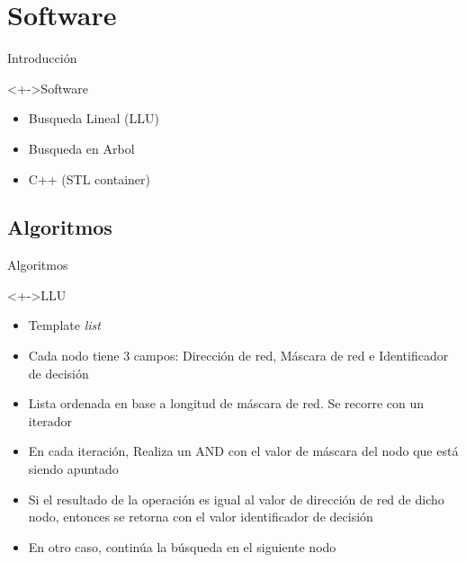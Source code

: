 \documentclass[xcolor=dvipsnames]{beamer}
\begin{document}
\section{Software}

\begin{frame}{Introducción}
 \begin{block}<+->{Software}
	\begin{itemize}
      \scriptsize
	\item Busqueda Lineal (LLU)
	\item Busqueda en Arbol
	\item C++ (STL container)	
	   \end{itemize}
\end{block}
\end{frame}



\subsection{Algoritmos}
\begin{frame}{Algoritmos}
\begin{block}<+->{LLU}   
    \begin{itemize}
      \scriptsize
     	
     	\item Template \emph{list}
     	\item Cada nodo tiene 3 campos: Dirección de red, Máscara de red e Identificador de decisión
	\item Lista ordenada en base a longitud de máscara de red. Se recorre con un iterador
	\item En cada iteración, Realiza un AND con el valor de máscara del nodo que está siendo apuntado
	\item Si el resultado de la operación es igual al valor de dirección de red de dicho nodo, entonces se retorna con el valor identificador de decisión
	\item En otro caso, continúa la búsqueda en el siguiente nodo
    \end{itemize}
  \end{block}
\end{frame}
\end{document}
